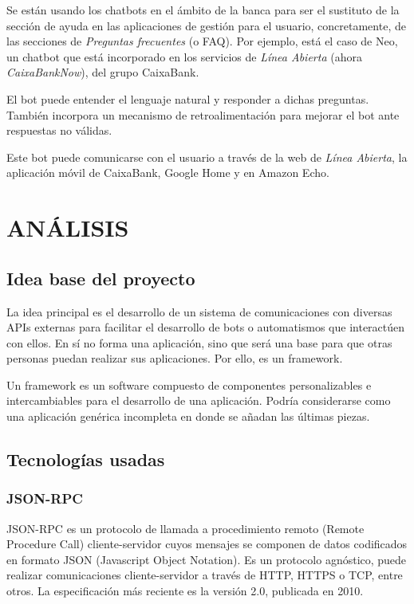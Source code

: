 \documentclass[spanish,12pt, a4paper, twoside]{paper}
\let\oldsection\section
\def\section{\cleardoublepage\oldsection}
\begin{document}
Se están usando los chatbots en el ámbito de la banca para ser el sustituto de la sección de ayuda en las aplicaciones de gestión para el usuario, concretamente, de las secciones de \emph{Preguntas frecuentes} (o FAQ). Por ejemplo, está el caso de Neo, un chatbot que está incorporado en los servicios de \emph{Línea Abierta} (ahora \emph{CaixaBankNow}), del grupo CaixaBank.
\newline

El bot puede entender el lenguaje natural y responder a dichas preguntas. También incorpora un mecanismo de retroalimentación para mejorar el bot ante respuestas no válidas.

Este bot puede comunicarse con el usuario a través de la web de \emph{Línea Abierta}, la aplicación móvil de CaixaBank, Google Home y en Amazon Echo.

\section{ANÁLISIS}

\subsection{Idea base del proyecto}

La idea principal es el desarrollo de un sistema de comunicaciones con diversas APIs externas para facilitar el desarrollo de bots o automatismos que interactúen con ellos. En sí no forma una aplicación, sino que será una base para que otras personas puedan realizar sus aplicaciones. Por ello, es un framework.
\newline

Un framework es un software compuesto de componentes personalizables e intercambiables para el desarrollo de una aplicación. Podría considerarse como una aplicación genérica incompleta en donde se añadan las últimas piezas. \cite[pág. 1]{FrameworkJJG}

\subsection{Tecnologías usadas}

\subsubsection{JSON-RPC}

JSON-RPC es un protocolo de llamada a procedimiento remoto (Remote Procedure Call) cliente-servidor cuyos mensajes se componen de datos codificados en formato JSON (Javascript Object Notation). Es un protocolo agnóstico, puede realizar comunicaciones cliente-servidor a través de HTTP, HTTPS o TCP, entre otros. La especificación más reciente es la versión 2.0, publicada en 2010.
\newline
\end{document}
